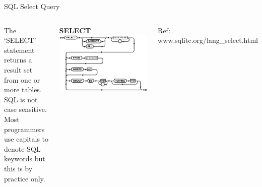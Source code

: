 \documentclass{beamer}
\begin{document}
\begin{frame}{SQL Select Query} \footnotesize 

\begin{columns}
 \footnotesize

\vspace{8pt}The `SELECT' statement returns a result set from one or more tables. \\

\vspace{8pt}SQL is not case sensitive. \\

\vspace{8pt}Most programmers use capitals to denote SQL keywords but this is by practice only. \\

\vspace{8pt} 


{\bf SELECT} \\
\vspace{4pt} \includegraphics[scale=0.35]{select-core.eps}

{\vspace{6pt} \tiny Ref: www.sqlite.org/lang\_select.html} 

\end{columns}

\end{frame}
\end{document}
